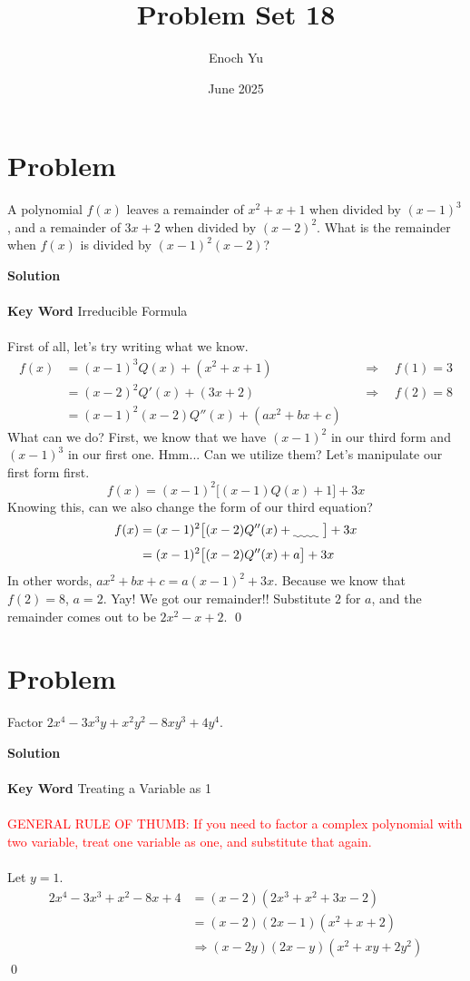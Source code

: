 \documentclass{article}
\title{Problem Set 18}
\author{Enoch Yu}
\date{June 2025}
\newenvironment{solution}{\begin{trivlist}\item[]{\bf Solution}}{\qed \end{trivlist}}
\begin{document}
\section*{Problem}
A polynomial $f(x)$ leaves a remainder of $x^2 + x + 1$ when divided by $(x - 1)^3$, and a remainder of $3x + 2$ when divided by $(x - 2)^2$. What is the remainder when $f(x)$ is divided by $(x - 1)^2(x - 2)$?
\begin{solution}
\\\\
\textbf{Key Word} Irreducible Formula
\\\\
First of all, let's try writing what we know.
\begin{align*}
    f(x) 
        &= (x - 1)^3 Q(x) + (x^2 + x + 1) 
            && \Rightarrow \quad f(1) = 3 \\[1.5ex]
        &= (x - 2)^2 Q'(x) + (3x + 2) 
            && \Rightarrow \quad f(2) = 8 \\[1.5ex]
        &= (x - 1)^2 (x-2) Q''(x) + (a x^2 + b x + c)
\end{align*}
What can we do? First, we know that we have $(x - 1)^2$ in our third form and $(x - 1)^3$ in our first one. Hmm... Can we utilize them? Let's manipulate our first form first.
\[
f(x) = (x - 1)^2 \big[ (x - 1) Q(x) + 1 \big] + 3x
\]
Knowing this, can we also change the form of our third equation?
\begin{align*}
    f(x)
    &= (x - 1)^2 \big[ (x-2) Q''(x) + \uwave{\quad\quad}\  \big] + 3x \\
    &= (x - 1)^2 \big[ (x-2) Q''(x) + a \big] + 3x
\end{align*}
In other words, $a x^2 + b x + c = a(x - 1)^2 + 3x$. Because we know that $f(2) = 8$, $a = 2$. Yay! We got our remainder!! Substitute $2$ for $a$, and the remainder comes out to be $\boxed{2x^2 - x + 2}$.
\end{solution}

\section*{Problem}
Factor $2x^4 - 3x^3y + x^2y^2 - 8xy^3 + 4y^4$.
\begin{solution}
\\\\
\textbf{Key Word} Treating a Variable as 1
\\\\
\textcolor{red}{GENERAL RULE OF THUMB: If you need to factor a complex polynomial with two variable, treat one variable as one, and substitute that again.}
\\\\
Let $y = 1$.
\begin{align*}
    2x^4 - 3x^3 + x^2 - 8x + 4
    &= (x - 2)(2x^3 + x^2 + 3x - 2) \\
    &= (x - 2)(2x - 1)(x^2 + x + 2) \\
    &\Rightarrow \boxed{(x - 2y)(2x - y)(x^2 + xy + 2y^2)}
\end{align*}
\end{solution}
\end{document}
